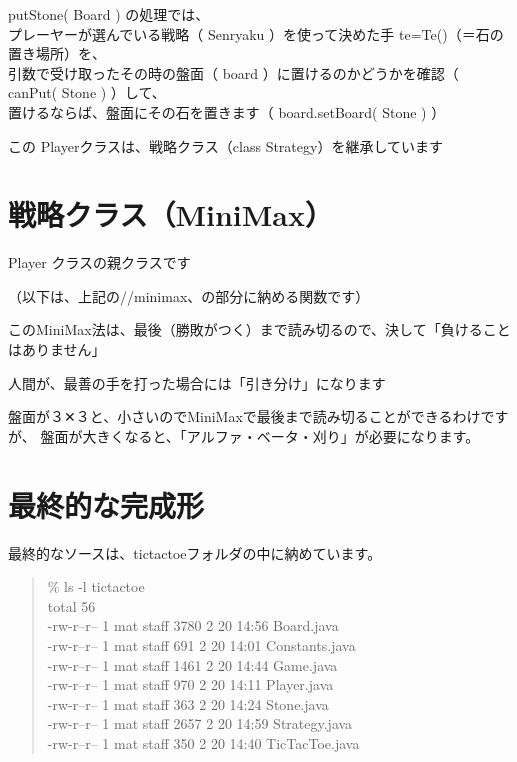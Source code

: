 \documentclass[uplatex,a4paper,11pt,oneside,openany]{jsbook}
\begin{document}
putStone( Board ) の処理では、\\プレーヤーが選んでいる戦略（ Senryaku ）を使って決めた手 te=Te()（＝石の置き場所）を、\\引数で受け取ったその時の盤面（ board ）に置けるのかどうかを確認（ canPut( Stone ) ）して、\\置けるならば、盤面にその石を置きます（ board.setBoard( Stone ) ）

この Playerクラスは、戦略クラス（class Strategy）を継承しています



\section{戦略クラス（MiniMax）}

Player クラスの親クラスです



（以下は、上記の//minimax、の部分に納める関数です）



このMiniMax法は、最後（勝敗がつく）まで読み切るので、決して「負けることはありません」

人間が、最善の手を打った場合には「引き分け」になります

盤面が３✕３と、小さいのでMiniMaxで最後まで読み切ることができるわけですが、
盤面が大きくなると、「アルファ・ベータ・刈り」が必要になります。

\section{最終的な完成形}

最終的なソースは、tictactoeフォルダの中に納めています。

\begin{quotation}
\% ls -l tictactoe\\
total 56\\
-rw-r--r--  1 mat  staff  3780  2 20 14:56 Board.java\\
-rw-r--r--  1 mat  staff   691  2 20 14:01 Constants.java\\
-rw-r--r--  1 mat  staff  1461  2 20 14:44 Game.java\\
-rw-r--r--  1 mat  staff   970  2 20 14:11 Player.java\\
-rw-r--r--  1 mat  staff   363  2 20 14:24 Stone.java\\
-rw-r--r--  1 mat  staff  2657  2 20 14:59 Strategy.java\\
-rw-r--r--  1 mat  staff   350  2 20 14:40 TicTacToe.java\\

\end{quotation}


%


%
\begin{thebibliography}{99}
\end{thebibliography}
%
\end{document}
